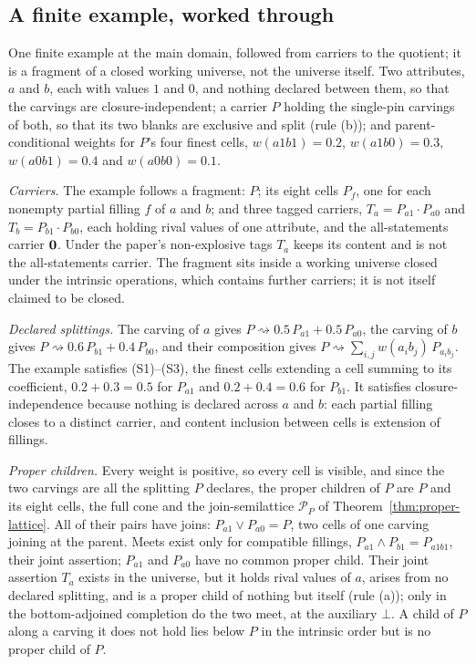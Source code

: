 \subsection{A finite example, worked through}\label{sec:model}

\noindent One finite example at the main domain, followed from carriers to the quotient; it is a fragment of a closed working universe, not the universe itself. Two attributes, $a$ and $b$, each with values $1$ and $0$, and nothing declared between them, so that the carvings are closure-independent; a carrier $P$ holding the single-pin carvings of both, so that its two blanks are exclusive and split (rule (b)); and parent-conditional weights for $P$'s four finest cells, $w(a1b1) = 0.2$, $w(a1b0) = 0.3$, $w(a0b1) = 0.4$ and $w(a0b0) = 0.1$.

\emph{Carriers.} The example follows a fragment: $P$; its eight cells $P_f$, one for each nonempty partial filling $f$ of $a$ and $b$; and three tagged carriers, $T_a = P_{a1} \cdot P_{a0}$ and $T_b = P_{b1} \cdot P_{b0}$, each holding rival values of one attribute, and the all-statements carrier $\mathbf{0}$. Under the paper's non-explosive tags $T_a$ keeps its content and is not the all-statements carrier. The fragment sits inside a working universe closed under the intrinsic operations, which contains further carriers; it is not itself claimed to be closed.

\emph{Declared splittings.} The carving of $a$ gives $P \rightsquigarrow 0.5\, P_{a1} + 0.5\, P_{a0}$, the carving of $b$ gives $P \rightsquigarrow 0.6\, P_{b1} + 0.4\, P_{b0}$, and their composition gives $P \rightsquigarrow \sum_{i,j} w(a_ib_j)\, P_{a_ib_j}$. The example satisfies (S1)--(S3), the finest cells extending a cell summing to its coefficient, $0.2 + 0.3 = 0.5$ for $P_{a1}$ and $0.2 + 0.4 = 0.6$ for $P_{b1}$. It satisfies closure-independence because nothing is declared across $a$ and $b$: each partial filling closes to a distinct carrier, and content inclusion between cells is extension of fillings.

\emph{Proper children.} Every weight is positive, so every cell is visible, and since the two carvings are all the splitting $P$ declares, the proper children of $P$ are $P$ and its eight cells, the full cone and the join-semilattice $\mathcal{P}_P$ of Theorem~\ref{thm:proper-lattice}. All of their pairs have joins: $P_{a1} \vee P_{a0} = P$, two cells of one carving joining at the parent. Meets exist only for compatible fillings, $P_{a1} \wedge P_{b1} = P_{a1b1}$, their joint assertion; $P_{a1}$ and $P_{a0}$ have no common proper child. Their joint assertion $T_a$ exists in the universe, but it holds rival values of $a$, arises from no declared splitting, and is a proper child of nothing but itself (rule (a)); only in the bottom-adjoined completion do the two meet, at the auxiliary $\bot$. A child of $P$ along a carving it does not hold lies below $P$ in the intrinsic order but is no proper child of $P$.


